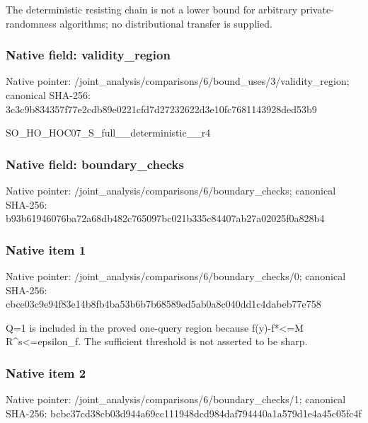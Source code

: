\documentclass[10pt,a4paper]{article}
\begin{document}
\begingroup\raggedright\sloppy The deterministic resisting chain is not a lower bound for arbitrary private-randomness algorithms;\allowbreak{} no distributional transfer is supplied.\par\endgroup

\subsubsection{Native field: validity\_\allowbreak{}region}
Native pointer: /joint\_\allowbreak{}analysis/comparisons/6/bound\_\allowbreak{}uses/3/validity\_\allowbreak{}region; canonical SHA-256: 3c3c9b834357f77e2cdb89e0221cfd7d27232622d3e10fc7681143928ded53b9

\begingroup\raggedright\sloppy SO\_\allowbreak{}HO\_\allowbreak{}HOC07\_\allowbreak{}S\_\allowbreak{}full\_\allowbreak{}\_\allowbreak{}deterministic\_\allowbreak{}\_\allowbreak{}r4\par\endgroup

\subsubsection{Native field: boundary\_\allowbreak{}checks}
Native pointer: /joint\_\allowbreak{}analysis/comparisons/6/boundary\_\allowbreak{}checks; canonical SHA-256: b93b61946076ba72a68db482c765097bc021b335c84407ab27a02025f0a828b4

\subsubsection{Native item 1}
Native pointer: /joint\_\allowbreak{}analysis/comparisons/6/boundary\_\allowbreak{}checks/0; canonical SHA-256: cbce03c9e94f83e14b8fb4ba53b6b7b68589ed5ab0a8c040dd1c4dabeb77e758

\begingroup\raggedright\sloppy Q=\allowbreak{}1 is included in the proved one-query region because f(y)-f*<=\allowbreak{}M R\textasciicircum{}s<=\allowbreak{}epsilon\_\allowbreak{}f. The sufficient threshold is not asserted to be sharp.\par\endgroup

\subsubsection{Native item 2}
Native pointer: /joint\_\allowbreak{}analysis/comparisons/6/boundary\_\allowbreak{}checks/1; canonical SHA-256: bcbc37cd38cb03d944a69cc111948dcd984daf794440a1a579d1e4a45c05fc4f
\end{document}
